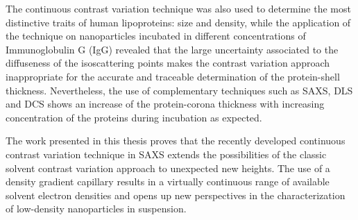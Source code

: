 The continuous contrast variation technique was also used to determine the most distinctive traits of human lipoproteins: size and density, while the application of the technique on nanoparticles incubated in different concentrations of Immunoglobulin G (IgG) revealed that the large uncertainty associated to the diffuseness of the isoscattering points makes the contrast variation approach inappropriate for the accurate and traceable determination of the protein-shell thickness. Nevertheless, the use of complementary techniques such as SAXS, DLS and DCS shows an increase of the protein-corona thickness with increasing concentration of the proteins during incubation as expected.


The work presented in this thesis proves that the recently developed continuous contrast variation technique in SAXS extends the possibilities of the classic solvent contrast variation approach to unexpected new heights. The use of a density gradient capillary results in a virtually continuous range of available solvent electron densities and opens up new perspectives in the characterization of low-density nanoparticles in suspension.
